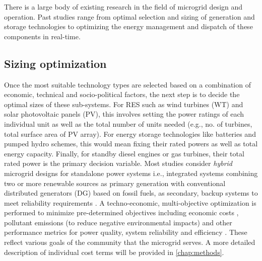 \documentclass[final,3p,times]{elsarticle}
\begin{document}
There is a large body of existing research in the field of microgrid design and operation. Past studies range from optimal selection and sizing of generation and storage technologies to optimizing the energy management and dispatch of these components in real-time. 

\subsection{Sizing optimization}

Once the most suitable technology types are selected based on a combination of economic, technical and socio-political factors, the next step is to decide the optimal sizes of these sub-systems. For RES such as wind turbines (WT) and solar photovoltaic panels (PV), this involves setting the power ratings of each individual unit as well as the total number of units needed (e.g., no. of turbines, total surface area of PV array). For energy storage technologies like batteries and pumped hydro schemes, this would mean fixing their rated powers as well as total energy capacity. Finally, for standby diesel engines or gas turbines, their total rated power is the primary decision variable. Most studies consider \textit{hybrid} microgrid designs for standalone power systems i.e., integrated systems combining two or more renewable sources as primary generation with conventional distributed generators (DG) based on fossil fuels, as secondary, backup systems to meet reliability requirements \cite{kaabeche2014} \cite{bhandari2014}. A techno-economic, multi-objective optimization is performed to minimize pre-determined objectives including economic costs \cite{tazvinga2013}, pollutant emissions (to reduce negative environmental impacts) and other performance metrics for power quality, system reliability and efficiency \cite{kaabeche2011a}. These reflect various goals of the community that the microgrid serves. A more detailed description of individual cost terms will be provided in \cref{chap:methods}.
 
\end{document}
